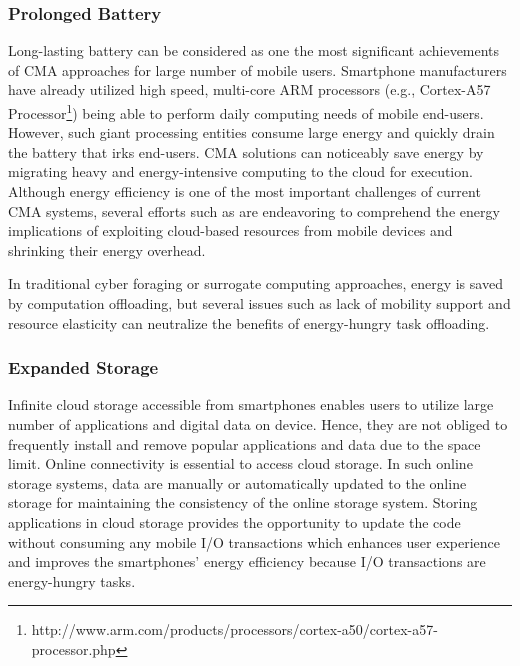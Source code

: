\documentclass[publish]{IEEEtran}
\begin{document}
\subsubsection{Prolonged Battery}
Long-lasting battery can be considered as one the most significant achievements of CMA approaches for large number of mobile users. Smartphone manufacturers have already utilized high speed, multi-core ARM processors (e.g., Cortex-A57 Processor\footnote{http://www.arm.com/products/processors/cortex-a50/cortex-a57-processor.php}) being able to perform daily computing needs of mobile end-users. However, such giant processing entities consume large energy and quickly drain the battery that irks end-users. CMA solutions can noticeably save energy \cite{Altamimi2012} by migrating heavy and energy-intensive computing to the cloud for execution. Although energy efficiency is one of the most important challenges of current CMA systems, several efforts such as \cite{DiFrancesco2012,Heide2012,Smith2012,Liu2011_VM,Gao2012} are endeavoring to comprehend the energy implications of exploiting cloud-based resources from mobile devices and shrinking their energy overhead.

In traditional cyber foraging or surrogate computing approaches, energy is saved by computation offloading, but several issues such as lack of mobility support and resource elasticity can neutralize the benefits of energy-hungry task offloading.

\subsubsection{Expanded Storage} \label{cloudstorage}
Infinite cloud storage accessible from smartphones enables users to utilize large number of applications and digital data on device. Hence, they are not obliged to frequently install and remove popular applications and data due to the space limit. Online connectivity is essential to access cloud storage. In such online storage systems, data are manually or automatically updated to the online storage for maintaining the consistency of the online storage system. Storing applications in cloud storage provides the opportunity to update the code without consuming any mobile I/O transactions which enhances user experience and improves the smartphones' energy efficiency \textemdash because I/O transactions are energy-hungry tasks. 
\end{document}
